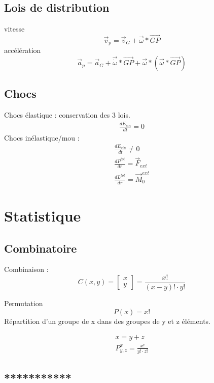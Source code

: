 \documentclass[12pt,a4paper,twoside]{article}
\numberwithin{equation}{subsection}
\begin{document}
\subsection{Lois de distribution}
vitesse
\begin{equation}
\vec{v}_p=\vec{v}_G+\vec{\omega}*\vec{GP}
\end{equation}
accélération
\begin{equation}
\vec{a}_p=\vec{a}_G+\vec{\dot{\omega}}*\vec{GP}+\vec{\omega}*(\vec{\omega}*\vec{GP})
\end{equation}

\subsection{Chocs}
Chocs élastique : conservation des 3 lois. 
\begin{eqnarray}
\frac{dE_{cin}}{dt} =0
\end{eqnarray}
Chocs inélastique/mou :
\begin{eqnarray}
\frac{dE_{cin}}{dt} \neq 0\\
\frac{d P^{tot}}{dr}=\vec{F}_{ext}\\
\frac{d L^{tot}}{dr}=\vec{M}_{0}^{ext}
\end{eqnarray}

\newpage
\section{Statistique}
\subsection{Combinatoire}
Combinaison : 
\begin{equation}
C(x,y)=\begin{bmatrix}
x\\
y
\end{bmatrix}=\frac{x!}{(x-y)!\cdot y!}
\end{equation}


Permutation
\begin{equation}
P(x)=x!
\end{equation}
Répartition d'un groupe de x dans des groupes de y et z éléments.

\begin{eqnarray}
x=y+z\\
P^x_{y,z}=\frac{x!}{y! \cdot z!}
\end{eqnarray}
\subsection{***********}
\end{document}
